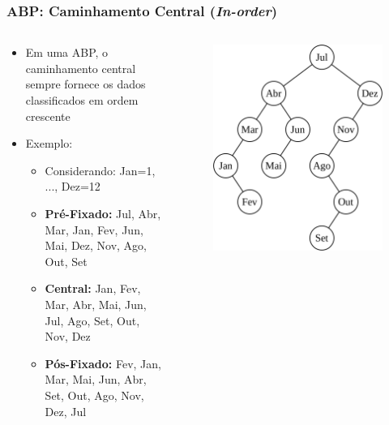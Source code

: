 \documentclass[aspectratio=169]{beamer}
\begin{document}
\begin{frame}\frametitle{ABP: Caminhamento Central (\emph{In-order})}
\begin{columns}[T]
\begin{column}{0.6\linewidth}
\begin{itemize}
	\item Em uma ABP, o caminhamento central sempre fornece os dados classificados em ordem crescente
	\item Exemplo:
	\begin{itemize}
		\item Considerando: Jan=1, ..., Dez=12
		\item \textbf{Pré-Fixado:} Jul, Abr, Mar, Jan, Fev, Jun, Mai, Dez, Nov, Ago, Out, Set
		\item \textbf{Central:}    Jan, Fev, Mar, Abr, Mai, Jun, Jul, Ago, Set, Out, Nov, Dez
		\item \textbf{Pós-Fixado:} Fev, Jan, Mar, Mai, Jun, Abr, Set, Out, Ago, Nov, Dez, Jul
	\end{itemize}
\end{itemize}
\end{column}
\begin{column}{0.4\linewidth}
\vspace{-3mm}
\begin{figure}[h]
	\centering
	\includegraphics[height=0.7\paperheight]{imagens/abp-meses.png}
\end{figure}
\end{column}
\end{columns}
\end{frame}
\end{document}
